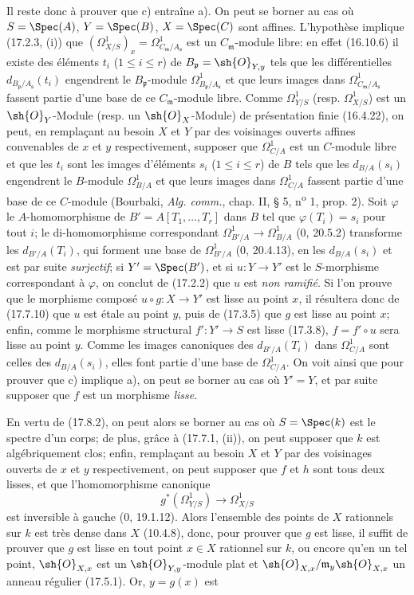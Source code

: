 
Il reste donc à prouver que c) entraîne a). On peut se borner au cas où $S=\Spec(A)$, $Y=\Spec(B)$, $X=\Spec(C)$ sont affines. L'hypothèse implique (17.2.3, (i)) que $(\Omega^1_{X/S})_x=\Omega^1_{C_{\mathfrak m}/A_{\mathfrak s}}$ est un $C_{\mathfrak m}$-module libre: en effet (16.10.6) il existe des éléments $t_i$ ($1\leq i\leq r$) de $B_{\mathfrak p}=\sh{O}_{Y,y}$ tels que les différentielles $d_{B_{\mathfrak p}/A_{\mathfrak s}}(t_i)$ engendrent le $B_{\mathfrak p}$-module $\Omega^1_{B_{\mathfrak p}/A_{\mathfrak s}}$ et que leurs images dans $\Omega^1_{C_{\mathfrak m}/A_{\mathfrak s}}$ fassent partie d'une base de ce $C_{\mathfrak m}$-module libre. Comme $\Omega^1_{Y/S}$ (resp. $\Omega^1_{X/S}$) est un $\sh{O}_Y$-Module (resp. un $\sh{O}_X$-Module) de présentation finie (16.4.22), on peut, en remplaçant au besoin $X$ et $Y$ par des voisinages ouverts affines convenables de $x$ et $y$ respectivement, supposer que $\Omega^1_{C/A}$ est un $C$-module libre et que les $t_i$ sont les images d'éléments $s_i$ ($1\leq i\leq r$) de $B$ tels que les $d_{B/A}(s_i)$ engendrent le $B$-module $\Omega^1_{B/A}$ et que leurs images dans $\Omega^1_{C/A}$ fassent partie d'une base de ce $C$-module (Bourbaki, \emph{Alg. comm.}, chap. II, § 5, n\textsuperscript{o} 1, prop. 2). Soit $\varphi$ le $A$-homomorphisme de $B'=A[T_1,\ldots,T_r]$ dans $B$ tel que $\varphi(T_i)=s_i$ pour tout $i$; le di-homomorphisme correspondant $\Omega^1_{B'/A}\to\Omega^1_{B/A}$ (0, 20.5.2) transforme les $d_{B'/A}(T_i)$, qui forment une base de $\Omega^1_{B'/A}$ (0, 20.4.13), en les $d_{B/A}(s_i)$ et est par suite \emph{surjectif}; si $Y'=\Spec(B')$, et si $u:Y\to Y'$ est le $S$-morphisme correspondant à $\varphi$, on conclut de (17.2.2) que $u$ est \emph{non ramifié}. Si l'on prouve que le morphisme composé $u\circ g:X\to Y'$ est lisse au point $x$, il résultera donc de (17.7.10) que $u$ est étale au point $y$, puis de (17.3.5) que $g$ est lisse au point $x$; enfin, comme le morphisme structural $f':Y'\to S$ est lisse (17.3.8), $f=f'\circ u$ sera lisse au point $y$. Comme les images canoniques des $d_{B'/A}(T_i)$ dans $\Omega^1_{C/A}$ sont celles des $d_{B/A}(s_i)$, elles font partie d'une base de $\Omega^1_{C/A}$. On voit ainsi que pour prouver que c) implique a), on peut se borner au cas où $Y'=Y$, et par suite supposer que $f$ est un morphisme \emph{lisse}.

En vertu de (17.8.2), on peut alors se borner au cas où $S=\Spec(k)$ est le spectre d'un corps; de plus, grâce à (17.7.1, (ii)), on peut supposer que $k$ est algébriquement clos; enfin, remplaçant au besoin $X$ et $Y$ par des voisinages ouverts de $x$ et $y$ respectivement, on peut supposer que $f$ et $h$ sont tous deux lisses, et que l'homomorphisme canonique
\[
g^*(\Omega^1_{Y/S})\to\Omega^1_{X/S}
\]
est inversible à gauche (0, 19.1.12). Alors l'ensemble des points de $X$ rationnels sur $k$ est très dense dans $X$ (10.4.8), donc, pour prouver que $g$ est lisse, il suffit de prouver que $g$ est lisse en tout point $x\in X$ rationnel sur $k$, ou encore qu'en un tel point, $\sh{O}_{X,x}$ est un $\sh{O}_{Y,y}$-module plat et $\sh{O}_{X,x}/\mathfrak m_y\sh{O}_{X,x}$ un anneau régulier (17.5.1). Or, $y=g(x)$ est

